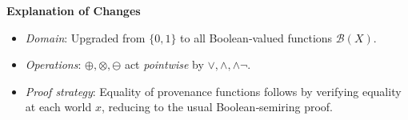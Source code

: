 \documentclass{article}
\begin{document}
\bigskip
\noindent\textbf{Explanation of Changes}
\begin{itemize}
  \item \emph{Domain}: Upgraded from \(\{0,1\}\) to all Boolean‐valued functions \(\mathcal{B}(X)\).
  \item \emph{Operations}: \(\oplus,\otimes,\ominus\) act \emph{pointwise} by \(\vee,\wedge,\wedge\neg\).
  \item \emph{Proof strategy}: Equality of provenance functions follows by verifying equality at each world \(x\), reducing to the usual Boolean‐semiring proof.
\end{itemize}
\end{document}
